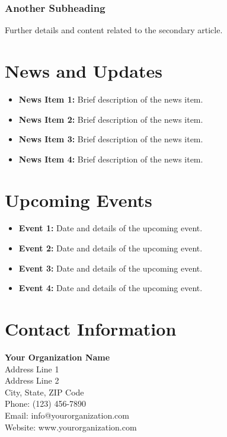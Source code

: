 \documentclass{article}
\begin{document}
\subsubsection*{Another Subheading}
Further details and content related to the secondary article.

\section*{News and Updates}
\begin{itemize}
    \item \textbf{News Item 1:} Brief description of the news item.
    \item \textbf{News Item 2:} Brief description of the news item.
    \item \textbf{News Item 3:} Brief description of the news item.
    \item \textbf{News Item 4:} Brief description of the news item.
\end{itemize}

\section*{Upcoming Events}
\begin{itemize}
    \item \textbf{Event 1:} Date and details of the upcoming event.
    \item \textbf{Event 2:} Date and details of the upcoming event.
    \item \textbf{Event 3:} Date and details of the upcoming event.
    \item \textbf{Event 4:} Date and details of the upcoming event.
\end{itemize}

\section*{Contact Information}
\textbf{Your Organization Name} \\
Address Line 1 \\
Address Line 2 \\
City, State, ZIP Code \\
Phone: (123) 456-7890 \\
Email: info@yourorganization.com \\
Website: www.yourorganization.com
\end{document}
